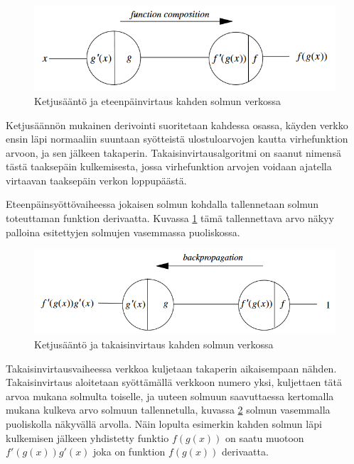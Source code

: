 \documentclass[finnish]{tktltiki2}
\theoremstyle{definition}
\theoremstyle{remark}
\begin{document}
  \begin{figure}[h]
    \centering
    \includegraphics[scale=0.5]{function-composition}
    \caption{Ketjusääntö ja eteenpäinvirtaus kahden solmun verkossa \cite{Rojas96}}
    \label{pic:composition}
  \end{figure}

  Ketjusäännön mukainen derivointi suoritetaan kahdessa osassa, käyden verkko ensin läpi normaaliin suuntaan syötteistä ulostuloarvojen kautta virhefunktion arvoon, ja sen jälkeen takaperin. Takaisinvirtausalgoritmi on saanut nimensä tästä taaksepäin kulkemisesta, jossa virhefunktion arvojen voidaan ajatella virtaavan taaksepäin verkon loppupäästä.
  
  Eteenpäinsyöttövaiheessa jokaisen solmun kohdalla tallennetaan solmun toteuttaman funktion derivaatta. Kuvassa \ref{pic:composition} tämä tallennettava arvo näkyy palloina esitettyjen solmujen vasemmassa puoliskossa.

  \begin{figure}[h]
    \centering
    \includegraphics[scale=0.5]{backpropagation}
    \caption{Ketjusääntö ja takaisinvirtaus kahden solmun verkossa \cite{Rojas96}}
    \label{pic:backpropagation}
  \end{figure}

  Takaisinvirtausvaiheessa verkkoa kuljetaan takaperin aikaisempaan nähden. Takaisinvirtaus aloitetaan syöttämällä verkkoon numero yksi, kuljettaen tätä arvoa mukana solmulta toiselle, ja uuteen solmuun saavuttaessa kertomalla mukana kulkeva arvo solmuun tallennetulla, kuvassa \ref{pic:backpropagation} solmun vasemmalla puoliskolla näkyvällä arvolla. Näin lopulta esimerkin kahden solmun läpi kulkemisen jälkeen yhdistetty funktio $f(g(x))$ on saatu muotoon $f'(g(x))g'(x)$ joka on funktion $f(g(x))$ derivaatta. 
\end{document}
